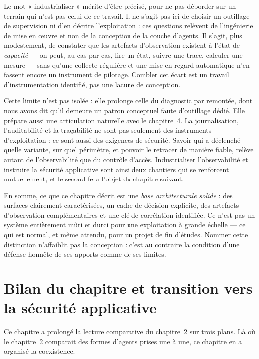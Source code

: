 Le mot « industrialiser » mérite d'être précisé, pour ne pas déborder
sur un terrain qui n'est pas celui de ce travail. Il ne s'agit pas ici
de choisir un outillage de supervision ni d'en décrire l'exploitation :
ces questions relèvent de l'ingénierie de mise en {\oe}uvre et non de
la conception de la couche d'agents. Il s'agit, plus modestement, de
constater que les artefacts d'observation existent à l'état de
\emph{capacité} — on peut, au cas par cas, lire un état, suivre une
trace, calculer une mesure — sans qu'une collecte régulière et une mise
en regard automatique n'en fassent encore un instrument de pilotage.
Combler cet écart est un travail d'instrumentation identifié, pas une
lacune de conception.

Cette limite n'est pas isolée : elle prolonge celle du diagnostic par
remontée, dont nous avons dit qu'il demeure un patron conceptuel
faute d'outillage dédié. Elle prépare aussi une articulation naturelle
avec le chapitre~4. La journalisation, l'auditabilité et la traçabilité
ne sont pas seulement des instruments d'exploitation : ce sont aussi
des exigences de sécurité. Savoir qui a déclenché quelle variante, sur
quel périmètre, et pouvoir le retracer de manière fiable, relève autant
de l'observabilité que du contrôle d'accès. Industrialiser
l'observabilité et instruire la sécurité applicative sont ainsi deux
chantiers qui se renforcent mutuellement, et le second fera l'objet du
chapitre suivant.

En somme, ce que ce chapitre décrit est une \emph{base architecturale
solide} : des surfaces clairement caractérisées, un cadre de décision
explicite, des artefacts d'observation complémentaires et une clé de
corrélation identifiée. Ce n'est pas un système entièrement mûri et
durci pour une exploitation à grande échelle — ce qui est normal, et
même attendu, pour un projet de fin d'études. Nommer cette distinction
n'affaiblit pas la conception : c'est au contraire la condition d'une
défense honnête de ses apports comme de ses limites.

\section{Bilan du chapitre et transition vers la sécurité applicative}
\label{sec:ch3-bilan}

Ce chapitre a prolongé la lecture comparative du chapitre~2 sur trois
plans. Là où le chapitre~2 comparait des formes d'agents prises une à
une, ce chapitre en a organisé la coexistence.

